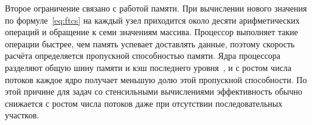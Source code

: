 Второе ограничение связано с работой памяти. При вычислении нового значения по формуле~\eqref{eq:ftcs} на каждый узел приходится около десяти арифметических операций и обращение к семи значениям массива. Процессор выполняет такие операции быстрее, чем память успевает доставлять данные, поэтому скорость расчёта определяется пропускной способностью памяти. Ядра процессора разделяют общую шину памяти и кэш последнего уровня~\cite{кудухов2014особенности}, и с ростом числа потоков каждое ядро получает меньшую долю этой пропускной способности. По этой причине для задач со стенсильными вычислениями эффективность обычно снижается с ростом числа потоков даже при отсутствии последовательных участков.
